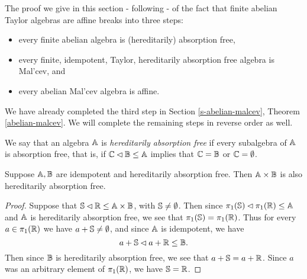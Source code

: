 \documentclass[letterpaper,11pt]{article}
\begin{document}
The proof we give in this section - following \cite{pointing-no-absorption} - of the fact that finite abelian Taylor algebras are affine breaks into three steps:
\begin{itemize}
\item every finite abelian algebra is (hereditarily) absorption free,

\item every finite, idempotent, Taylor, hereditarily absorption free algebra is Mal'cev, and

\item every abelian Mal'cev algebra is affine.
\end{itemize}
We have already completed the third step in Section \ref{s-abelian-malcev}, Theorem \ref{abelian-malcev}. We will complete the remaining steps in reverse order as well.

\begin{defn} We say that an algebra $\mathbb{A}$ is \emph{hereditarily absorption free} if every subalgebra of $\mathbb{A}$ is absorption free, that is, if $\mathbb{C} \lhd \mathbb{B} \le \mathbb{A}$ implies that $\mathbb{C} = \mathbb{B}$ or $\mathbb{C} = \emptyset$.
\end{defn}

\begin{prop} Suppose $\mathbb{A}, \mathbb{B}$ are idempotent and hereditarily absorption free. Then $\mathbb{A} \times \mathbb{B}$ is also hereditarily absorption free.
\end{prop}
\begin{proof} Suppose that $\mathbb{S} \lhd \mathbb{R} \le \mathbb{A} \times \mathbb{B}$, with $\mathbb{S} \ne \emptyset$. Then since $\pi_1(\mathbb{S}) \lhd \pi_1(\mathbb{R}) \le \mathbb{A}$ and $\mathbb{A}$ is hereditarily absorption free, we see that $\pi_1(\mathbb{S}) = \pi_1(\mathbb{R})$. Thus for every $a \in \pi_1(\mathbb{R})$ we have $a + \mathbb{S} \ne \emptyset$, and since $\mathbb{A}$ is idempotent, we have
\[
a+\mathbb{S} \lhd a+\mathbb{R} \le \mathbb{B}.
\]
Then since $\mathbb{B}$ is hereditarily absorption free, we see that $a+\mathbb{S} = a+\mathbb{R}$. Since $a$ was an arbitrary element of $\pi_1(\mathbb{R})$, we have $\mathbb{S} = \mathbb{R}$.
\end{proof}
\end{document}

